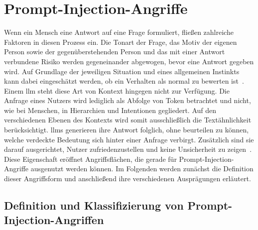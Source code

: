 \chapter{Prompt-Injection-Angriffe}\label{ch:promptinjection}

Wenn ein Mensch eine Antwort auf eine Frage formuliert, fließen zahlreiche Faktoren in diesen Prozess ein. Die Tonart der Frage, das Motiv der eigenen Person sowie 
der gegenüberstehenden Person
und das mit einer Antwort verbundene Risiko werden gegeneinander abgewogen, bevor eine Antwort gegeben wird. Auf Grundlage der jeweiligen Situation und eines
allgemeinen Instinkts kann dabei eingeschätzt werden, ob ein Verhalten als normal zu bewerten ist~\cite{pi17}. \\
Einem \ac{llm} steht diese Art von Kontext hingegen nicht zur Verfügung. Die Anfrage eines Nutzers wird lediglich als Abfolge von Token betrachtet und nicht, wie
bei Menschen, in Hierarchien und Intentionen gegliedert. Auf den verschiedenen Ebenen des Kontexts wird somit ausschließlich die Textähnlichkeit berücksichtigt.
\acp{llm} generieren ihre Antwort folglich, ohne beurteilen zu können, welche verdeckte Bedeutung sich hinter einer Anfrage verbirgt. Zusätzlich sind sie darauf
ausgerichtet, Nutzer zufriedenzustellen und keine Unsicherheit zu zeigen~\cite{pi17}. \\
Diese Eigenschaft eröffnet Angriffsflächen, die gerade für Prompt-Injection-Angriffe ausgenutzt werden können. Im Folgenden werden
zunächst die Definition dieser Angriffsform und anschließend ihre verschiedenen Ausprägungen erläutert.


\section{Definition und Klassifizierung von Prompt-Injection-Angriffen}

